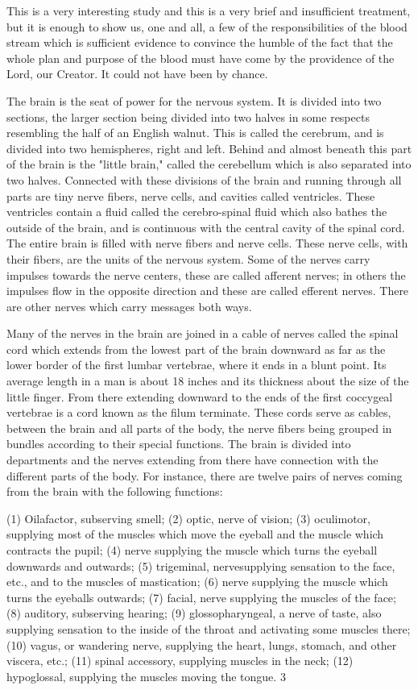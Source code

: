 This is a very interesting study and this is a very brief and insufficient treatment, but it is
enough to show us, one and all, a few of the responsibilities of the blood stream which is
sufficient evidence to convince the humble of the fact that the whole plan and purpose of the
blood must have come by the providence of the Lord, our Creator. It could not have been by
chance.

The brain is the seat of power for the nervous system. It is divided into two sections, the
larger section being divided into two halves in some respects resembling the half of an
English walnut. This is called the cerebrum, and is divided into two hemispheres, right and
left. Behind and almost beneath this part of the brain is the "little brain," called the
cerebellum which is also separated into two halves. Connected with these divisions of the
brain and running through all parts are tiny nerve fibers, nerve cells, and cavities called
ventricles. These ventricles contain a fluid called the cerebro-spinal fluid which also bathes
the outside of the brain, and is continuous with the central cavity of the spinal cord. The
entire brain is filled with nerve fibers and nerve cells. These nerve cells, with their fibers, are
the units of the nervous system. Some of the nerves carry impulses towards the nerve centers,
these are called afferent nerves; in others the impulses flow in the opposite direction and
these are called efferent nerves. There are other nerves which carry messages both ways.

Many of the nerves in the brain are joined in a cable of nerves called the spinal cord which
extends from the lowest part of the brain downward as far as the lower border of the first
lumbar vertebrae, where it ends in a blunt point. Its average length in a man is about 18
inches and its thickness about the size of the little finger. From there extending downward to
the ends of the first coccygeal vertebrae is a cord known as the filum terminate. These cords
serve as cables, between the brain and all parts of the body, the nerve fibers being grouped in
bundles according to their special functions. The brain is divided into departments and the
nerves extending from there have connection with the different parts of the body. For
instance, there are twelve pairs of nerves coming from the brain with the following functions:

(1) Oilafactor, subserving smell; (2) optic, nerve of vision; (3) oculimotor, supplying most of
the muscles which move the eyeball and the muscle which contracts the pupil; (4) nerve
supplying the muscle which turns the eyeball downwards and outwards; (5) trigeminal, nervesupplying sensation to the face, etc., and to the muscles of mastication; (6) nerve supplying
the muscle which turns the eyeballs outwards; (7) facial, nerve supplying the muscles of the
face; (8) auditory, subserving hearing; (9) glossopharyngeal, a nerve of taste, also supplying
sensation to the inside of the throat and activating some muscles there; (10) vagus, or
wandering nerve, supplying the heart, lungs, stomach, and other viscera, etc.; (11) spinal
accessory, supplying muscles in the neck; (12) hypoglossal, supplying the muscles moving
the tongue. 3


